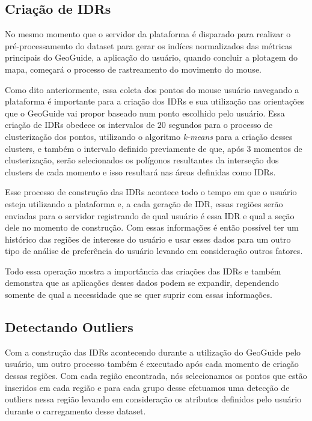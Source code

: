 \subsection{Criação de IDRs}

No mesmo momento que o servidor da plataforma é disparado para realizar o pré-processamento do dataset para gerar os indíces normalizados das métricas principais do GeoGuide, a aplicação do usuário, quando concluir a plotagem do mapa, começará o processo de rastreamento do movimento do mouse.

Como dito anteriormente, essa coleta dos pontos do mouse usuário navegando a plataforma é importante para a criação dos IDRs e sua utilização nas orientações que o GeoGuide vai propor baseado num ponto escolhido pelo usuário. Essa criação de IDRs obedece os intervalos de $20$ segundos para o processo de clusterização dos pontos, utilizando o algoritmo \textit{k-means} para a criação desses clusters, e também o intervalo definido previamente de que, após $3$ momentos de clusterização, serão selecionados os polígonos resultantes da interseção dos clusters de cada momento e isso resultará nas áreas definidas como IDRs.

Esse processo de construção das IDRs acontece todo o tempo em que o usuário esteja utilizando a plataforma e, a cada geração de IDR, essas regiões serão enviadas para o servidor registrando de qual usuário é essa IDR e qual a seção dele no momento de construção. Com essas informações é então possível ter um histórico das regiões de interesse do usuário e usar esses dados para um outro tipo de análise de preferência do usuário levando em consideração outros fatores.

Todo essa operação mostra a importância das criações das IDRs e também demonstra que as aplicações desses dados podem se expandir, dependendo somente de qual a necessidade que se quer suprir com essas informações.

\subsection{Detectando Outliers}

Com a construção das IDRs acontecendo durante a utilização do GeoGuide pelo usuário, um outro processo também é executado após cada momento de criação dessas regiões. Com cada região encontrada, nós selecionamos os pontos que estão inseridos em cada região e para cada grupo desse efetuamos uma detecção de outliers nessa região levando em consideração os atributos definidos pelo usuário durante o carregamento desse dataset.

